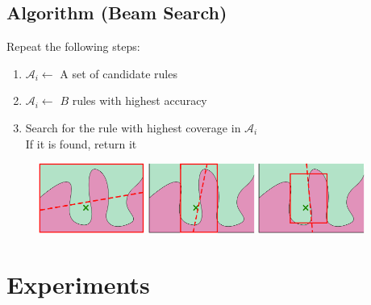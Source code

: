 \documentclass[aspectratio=169]{slide-en}
\begin{document}
\subsection{Algorithm (Beam Search)}

\begin{frame}{}
  \bigskip
  \bigskip
  Repeat the following steps:
  \begin{enumerate}
    \item $\mathcal{A}_i\gets$ A set of candidate rules
    \item $\mathcal{A}_i\gets$ $B$ rules with highest accuracy
    \item Search for the rule with highest coverage in $\mathcal{A}_i$ \\
          If it is found, return it
  \end{enumerate}
  \vspace{-1em}
  \begin{figure}[t]
    \centering
    \includegraphics[width=0.31\textwidth]{visual-rlime1}
    \includegraphics[width=0.31\textwidth]{visual-rlime2}
    \includegraphics[width=0.31\textwidth]{visual-rlime3}
  \end{figure}
\end{frame}

\section{Experiments}
\end{document}
